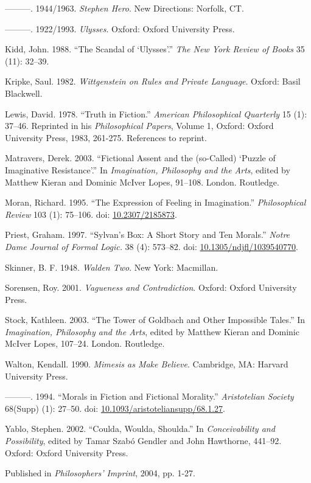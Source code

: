 \documentclass[
  10pt,
  letterpaper,
  DIV=11,
  numbers=noendperiod,
  twoside]{scrartcl}
\newlength{\cslhangindent}
\newenvironment{CSLReferences}[2] %
 {\begin{list}{}{%
  \setlength{\itemindent}{0pt}
  \setlength{\leftmargin}{0pt}
  \setlength{\parsep}{0pt}
  \ifodd #1
   \setlength{\leftmargin}{\cslhangindent}
   \setlength{\itemindent}{-1\cslhangindent}
  \fi
  \setlength{\itemsep}{#2\baselineskip}}}
 {\end{list}}
\begin{document}
\begin{CSLReferences}{1}{0}
---------. 1944/1963. \emph{Stephen Hero}. New Directions: Norfolk, CT.

---------. 1922/1993. \emph{Ulysses}. Oxford: Oxford University Press.

Kidd, John. 1988. {``The Scandal of {`Ulysses'}.''} \emph{The New York
Review of Books} 35 (11): 32--39.

Kripke, Saul. 1982. \emph{Wittgenstein on Rules and Private Language}.
Oxford: Basil Blackwell.

Lewis, David. 1978. {``Truth in Fiction.''} \emph{American Philosophical
Quarterly} 15 (1): 37--46. Reprinted in his \emph{Philosophical Papers},
Volume 1, Oxford: Oxford University Press, 1983, 261-275. References to
reprint.

Matravers, Derek. 2003. {``Fictional Assent and the (so-Called) {`Puzzle
of Imaginative Resistance'}.''} In \emph{Imagination, Philosophy and the
Arts}, edited by Matthew Kieran and Dominic McIver Lopes, 91--108.
London. Routledge.

Moran, Richard. 1995. {``The Expression of Feeling in Imagination.''}
\emph{Philosophical Review} 103 (1): 75--106. doi:
\href{https://doi.org/10.2307/2185873}{10.2307/2185873}.

Priest, Graham. 1997. {``Sylvan's Box: A Short Story and Ten Morals.''}
\emph{Notre Dame Journal of Formal Logic.} 38 (4): 573--82. doi:
\href{https://doi.org/10.1305/ndjfl/1039540770}{10.1305/ndjfl/1039540770}.

Skinner, B. F. 1948. \emph{Walden Two}. New York: Macmillan.

Sorensen, Roy. 2001. \emph{Vagueness and Contradiction}. Oxford: Oxford
University Press.

Stock, Kathleen. 2003. {``The Tower of Goldbach and Other Impossible
Tales.''} In \emph{Imagination, Philosophy and the Arts}, edited by
Matthew Kieran and Dominic McIver Lopes, 107--24. London. Routledge.

Walton, Kendall. 1990. \emph{Mimesis as Make Believe}. Cambridge, MA:
Harvard University Press.

---------. 1994. {``Morals in Fiction and Fictional Morality.''}
\emph{Aristotelian Society} 68(Supp) (1): 27--50. doi:
\href{https://doi.org/10.1093/aristoteliansupp/68.1.27}{10.1093/aristoteliansupp/68.1.27}.

Yablo, Stephen. 2002. {``Coulda, Woulda, Shoulda.''} In
\emph{Conceivability and Possibility}, edited by Tamar Szabó Gendler and
John Hawthorne, 441--92. Oxford: Oxford University Press.

\end{CSLReferences}



\noindent Published in\emph{
Philosophers’ Imprint}, 2004, pp. 1-27.
\end{document}
